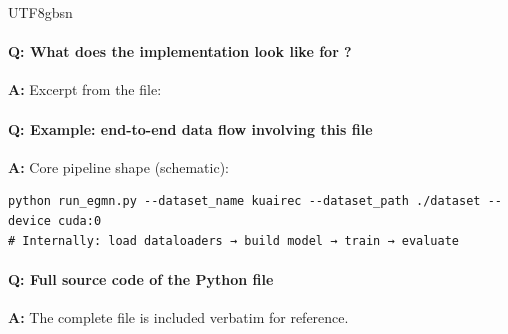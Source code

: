 \documentclass[11pt]{article}
\begin{document}
\begin{CJK*}{UTF8}{gbsn}
\paragraph{Q: What does the implementation look like for \texttt{}?}
\textbf{A:} Excerpt from the file:

\vspace{1mm}


\paragraph{Q: Example: end-to-end data flow involving this file}
\textbf{A:} Core pipeline shape (schematic):

\begin{Verbatim}[fontsize=\small]
python run_egmn.py --dataset_name kuairec --dataset_path ./dataset --device cuda:0
# Internally: load dataloaders → build model → train → evaluate
\end{Verbatim}

\paragraph{Q: Full source code of the Python file}
\textbf{A:} The complete file is included verbatim for reference.


\end{CJK*}
\end{document}
